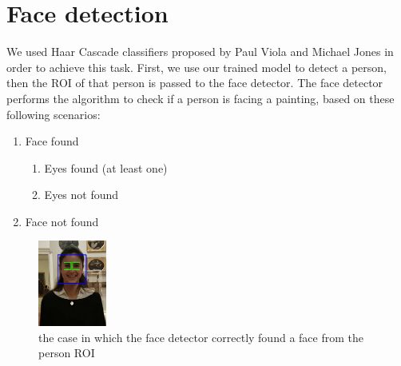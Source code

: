 \section{Face detection}
We used Haar Cascade classifiers \cite{haar_cascade} proposed by Paul Viola and Michael Jones in order to achieve this task. First, we use our trained model to detect a person, then the ROI of that person is passed to the face detector. The face detector performs the algorithm to check if a person is facing a painting, based on these following scenarios:
\begin{enumerate}[label=\alph*)]
    \item Face found
    \begin{enumerate}[label=(\roman*)]
        \item \label{Eyes found} Eyes found (at least one)
        \item \label{Eyes not found} Eyes not found
    \end{enumerate}
    \item \label{Face not found} Face not found
\end{enumerate}

\begin{figure}[h!]
    \centering
    \includegraphics[width=0.2\textwidth]{pictures/face_detection/face_det2}
    \caption{the case in which the face detector correctly found a face from the person ROI}
    \label{fig:Eyes}
\end{figure}

